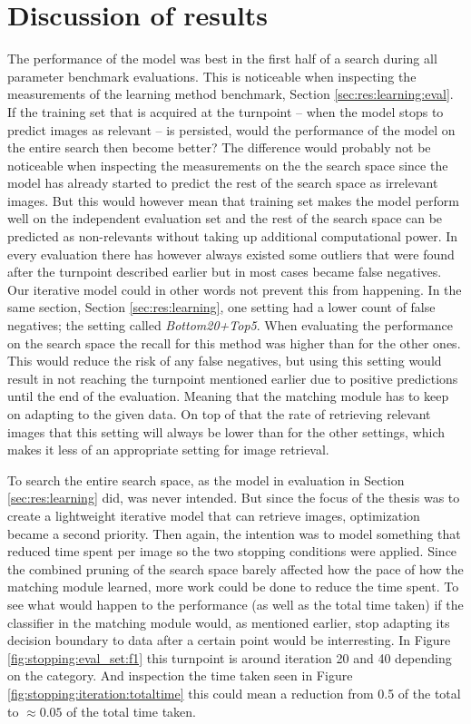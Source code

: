 
\section{Discussion of results}
\label{sec:concl:meas}
The performance of the model was best in the first half of a search during all parameter benchmark evaluations. This is noticeable when inspecting the measurements of the learning method benchmark, Section \ref{sec:res:learning:eval}. If the training set that is acquired at the turnpoint -- when the model stops to predict images as relevant -- is persisted, would the performance of the model on the entire search then become better? The difference would probably not be noticeable when inspecting the measurements on the the search space since the model has already started to predict the rest of the search space as irrelevant images. But this would however mean that training set makes the model perform well on the independent evaluation set and the rest of the search space can be predicted as non-relevants without taking up additional computational power. In every evaluation there has however always existed some outliers that were found after the turnpoint described earlier but in most cases became false negatives. Our iterative model could in other words not prevent this from happening. 
In the same section, Section \ref{sec:res:learning}, one setting had a lower count of false negatives; the setting called \emph{Bottom20+Top5}. When evaluating the performance on the search space the recall for this method was higher than for the other ones. This would reduce the risk of any false negatives, but using this setting would result in not reaching the turnpoint mentioned earlier due to positive predictions until the end of the evaluation. Meaning that the matching module has to keep on adapting to the given data. On top of that the rate of retrieving relevant images that this setting will always be lower than for the other settings, which makes it less of an appropriate setting for image retrieval. 


To search the entire search space, as the model in evaluation in Section \ref{sec:res:learning} did, was never intended. But since the focus of the thesis was to create a lightweight iterative model that can retrieve images, optimization became a second priority. Then again, the intention was to model something that reduced time spent per image so the two stopping 
conditions were applied. Since the combined pruning of the search space barely affected how the pace of how the matching module learned, more work could be done to reduce the time spent. To see what would happen to the performance (as well as the total time taken) if the classifier in the matching module would, as mentioned earlier, stop adapting its decision boundary to data after a certain point would be interresting. In Figure \ref{fig:stopping:eval_set:f1} this turnpoint is around iteration 20 and 40 depending on the category. And inspection the time taken seen in Figure \ref{fig:stopping:iteration:totaltime} this could mean a reduction from 0.5 of the total to $\approx0.05$ of the total time taken.  


